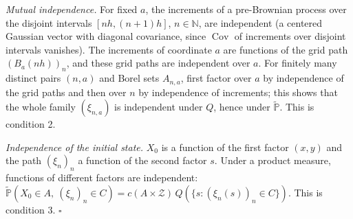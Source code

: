\documentclass[11pt,a4paper]{article}
\begin{document}
\emph{Mutual independence.} For fixed \(a\), the increments of a pre-Brownian process over the disjoint intervals \([nh,(n+1)h]\), \(n\in\mathbb N\), are independent (a centered Gaussian vector with diagonal covariance, since \(\operatorname{Cov}\) of increments over disjoint intervals vanishes). The increments of coordinate \(a\) are functions of the grid path \((B_a(nh))_n\), and these grid paths are independent over \(a\). For finitely many distinct pairs \((n,a)\) and Borel sets \(A_{n,a}\), first factor over \(a\) by independence of the grid paths and then over \(n\) by independence of increments; this shows that the whole family \((\xi_{n,a})\) is independent under \(Q\), hence under \(\tilde{\mathbb P}\). This is condition 2.




\emph{Independence of the initial state.} \(X_0\) is a function of the first factor \((x,y)\) and the path \((\xi_n)_n\) a function of the second factor \(s\). Under a product measure, functions of different factors are independent: \(\tilde{\mathbb P}(X_0\in A,\ (\xi_n)_n\in C)=c(A\times\mathcal Z)\,Q(\{s:(\xi_n(s))_n\in C\})\). This is condition 3. \(\square\)
\end{document}
